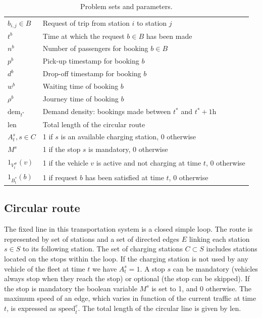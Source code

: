 \documentclass[12pt,a4paper]{article}
\begin{document}
\begin{table}
\begin{tabularx}{\linewidth}{| l | Y |}
  $b_{i,j} \in B$ & Request of trip from station $i$ to station $j$\\
  $t^{b}$ & Time at which the request $b \in B$ has been made \\
  $n^{b}$ & Number of passengers for booking $b \in B$ \\
  $p^{b}$ & Pick-up timestamp for booking $b$ \\
  $d^{b}$ & Drop-off timestamp for booking $b$ \\
  $w^{b}$ & Waiting time of booking $b$ \\
  $\rho^{b}$ & Journey time of booking $b$ \\
  $\text{dem}_{t^{*}}$ & Demand density: bookings made between $t^{*}$ and $t^{*} + 1\text{h}$\\
  $\text{len}$ & Total length of the circular route \\

  $A^{s}_{t}, s \in C$ & 1 if $s$ is an available charging station, 0 otherwise \\
  $M^{s}$ & 1 if the stop $s$  is mandatory, 0 otherwise \\
  $1_{V^{\#}_{t}}(v)$ & 1 if the vehicle $v$ is active and not charging at time $t$, 0 otherwise \\
  $1_{B^{*}_{t}}(b)$ & 1 if request $b$ has been satisfied at time $t$, 0 otherwise \\
  \hline  
\end{tabularx}
\caption{Problem sets and parameters.}
\label{table:parameters}
\end{table}
\subsection{Circular route}
The fixed line in this transportation system is a closed simple loop. The route is represented by set of stations and a set of directed edges $E$ linking each station $s \in S$ to its following station. The set of charging stations $C \subset S$ includes stations located on the stops within the loop. If the charging station is not used by any vehicle of the fleet at time $t$ we have $A^{s}_{t} = 1$. A stop $s$ can be mandatory (vehicles always stop when they reach the stop) or optional (the stop can be skipped). If the stop is mandatory the boolean variable $M^{s}$ is set to 1, and 0 otherwise. The maximum speed of an edge, which varies in function of the current traffic at time $t$, is expressed as $\text{speed}^{e}_{t}$. The total length of the circular line is given by $\text{len}$.
\end{document}
